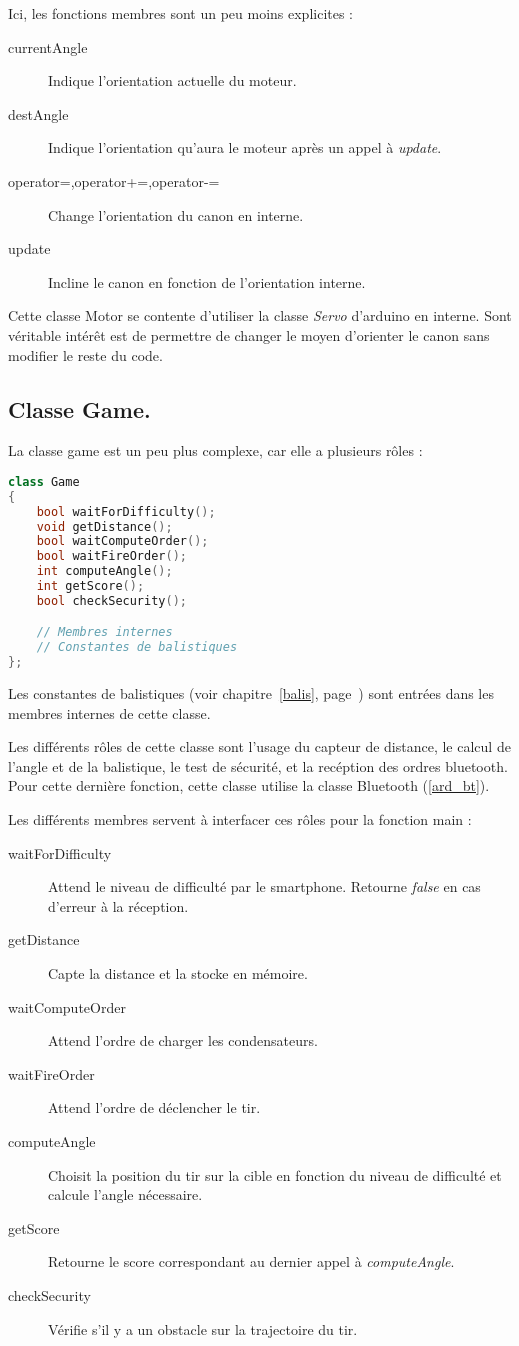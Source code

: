 Ici, les fonctions membres sont un peu moins explicites :\begin{description}
	\item[currentAngle] Indique l'orientation actuelle du moteur.
	\item[destAngle] Indique l'orientation qu'aura le moteur après un appel à \emph{update}.
	\item[operator=,operator+=,operator-=] Change l'orientation du canon en interne.
	\item[update] Incline le canon en fonction de l'orientation interne.
\end{description}

Cette classe Motor se contente d'utiliser la classe \emph{Servo} d'arduino en interne. Sont véritable intérêt est de permettre de changer le moyen d'orienter le canon sans modifier le reste du code.

\subsection{Classe Game.} \label{ard_game}
La classe game est un peu plus complexe, car elle a plusieurs rôles :
\begin{lstlisting}[language=C++]
class Game
{
	bool waitForDifficulty();
	void getDistance();
	bool waitComputeOrder();
	bool waitFireOrder();
	int computeAngle();
	int getScore();
	bool checkSecurity();

	// Membres internes
	// Constantes de balistiques
};
\end{lstlisting}

Les constantes de balistiques (voir chapitre~\ref{balis}, page~\pageref{balis}) sont entrées dans les membres internes de cette classe.

Les différents rôles de cette classe sont l'usage du capteur de distance, le calcul de l'angle et de la balistique, le test de sécurité, et la recéption des ordres bluetooth. Pour cette dernière fonction, cette classe utilise la classe Bluetooth (\ref{ard_bt}).

Les différents membres servent à interfacer ces rôles pour la fonction main : \begin{description}
	\item[waitForDifficulty] Attend le niveau de difficulté par le smartphone. Retourne \emph{false} en cas d'erreur à la réception.
	\item[getDistance] Capte la distance et la stocke en mémoire.
	\item[waitComputeOrder] Attend l'ordre de charger les condensateurs.
	\item[waitFireOrder] Attend l'ordre de déclencher le tir.
	\item[computeAngle] Choisit la position du tir sur la cible en fonction du niveau de difficulté et calcule l'angle nécessaire.
	\item[getScore] Retourne le score correspondant au dernier appel à \emph{computeAngle}.
	\item[checkSecurity] Vérifie s'il y a un obstacle sur la trajectoire du tir.
\end{description}

